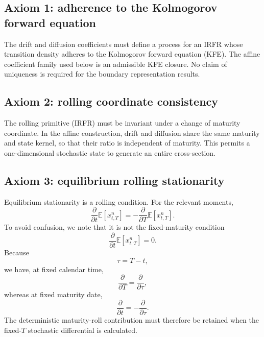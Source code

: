 \documentclass[12pt]{article}
\numberwithin{equation}{subsection}
\newcommand{\E}{\mathbb{E}}
\begin{document}
\subsection{Axiom 1: adherence to the Kolmogorov forward equation}

The drift and diffusion coefficients must define a process for an IRFR whose transition density adheres to the Kolmogorov forward equation (KFE). The affine coefficient family used below is an admissible KFE closure. No claim of uniqueness is required for the boundary representation results.

\subsection{Axiom 2: rolling coordinate consistency}

The rolling primitive (IRFR) must be invariant under a change of maturity coordinate. In the affine construction, drift and diffusion share the same maturity and state kernel, so that their ratio is independent of maturity. This permits a one-dimensional stochastic state to generate an entire cross-section.

\subsection{Axiom 3: equilibrium rolling stationarity}

Equilibrium stationarity is a rolling condition. For the relevant moments,
\begin{equation}
\boxed{\frac{\partial}{\partial t}\E\!\left[x_{t,T}^n\right]
=
-\frac{\partial}{\partial T}\E\!\left[x_{t,T}^n\right].}
\end{equation}
To avoid confusion, we note that it is not the fixed-maturity condition
\begin{equation}
\frac{\partial}{\partial t}\E\!\left[x_{t,T}^n\right]=0.
\end{equation}
Because
\begin{equation}
\tau=T-t,
\end{equation}
we have, at fixed calendar time,
\begin{equation}
\frac{\partial}{\partial T}=\frac{\partial}{\partial\tau},
\end{equation}
whereas at fixed maturity date,
\begin{equation}
\frac{\partial}{\partial t}=-\frac{\partial}{\partial\tau}.
\end{equation}
The deterministic maturity-roll contribution must therefore be retained when the fixed-$T$ stochastic differential is calculated.
\end{document}
